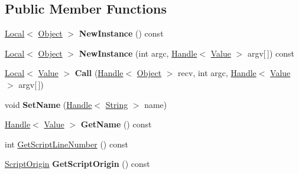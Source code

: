 \subsection*{Public Member Functions}
\begin{DoxyCompactItemize}
\item 
\hypertarget{classv8_1_1_function_a2bbac81200b840cbd484679aaa5b03d4}{}\hyperlink{classv8_1_1_local}{Local}$<$ \hyperlink{classv8_1_1_object}{Object} $>$ {\bfseries New\+Instance} () const \label{classv8_1_1_function_a2bbac81200b840cbd484679aaa5b03d4}

\item 
\hypertarget{classv8_1_1_function_a1261371c01bf18be5564f290af22e9d9}{}\hyperlink{classv8_1_1_local}{Local}$<$ \hyperlink{classv8_1_1_object}{Object} $>$ {\bfseries New\+Instance} (int argc, \hyperlink{classv8_1_1_handle}{Handle}$<$ \hyperlink{classv8_1_1_value}{Value} $>$ argv\mbox{[}$\,$\mbox{]}) const \label{classv8_1_1_function_a1261371c01bf18be5564f290af22e9d9}

\item 
\hypertarget{classv8_1_1_function_a168c16f181c5d5ff9ebe7db952c12b04}{}\hyperlink{classv8_1_1_local}{Local}$<$ \hyperlink{classv8_1_1_value}{Value} $>$ {\bfseries Call} (\hyperlink{classv8_1_1_handle}{Handle}$<$ \hyperlink{classv8_1_1_object}{Object} $>$ recv, int argc, \hyperlink{classv8_1_1_handle}{Handle}$<$ \hyperlink{classv8_1_1_value}{Value} $>$ argv\mbox{[}$\,$\mbox{]})\label{classv8_1_1_function_a168c16f181c5d5ff9ebe7db952c12b04}

\item 
\hypertarget{classv8_1_1_function_a5e244ce13d6f30ffa69f520126ada795}{}void {\bfseries Set\+Name} (\hyperlink{classv8_1_1_handle}{Handle}$<$ \hyperlink{classv8_1_1_string}{String} $>$ name)\label{classv8_1_1_function_a5e244ce13d6f30ffa69f520126ada795}

\item 
\hypertarget{classv8_1_1_function_adbbf95a036859381c06af3d05cd74b07}{}\hyperlink{classv8_1_1_handle}{Handle}$<$ \hyperlink{classv8_1_1_value}{Value} $>$ {\bfseries Get\+Name} () const \label{classv8_1_1_function_adbbf95a036859381c06af3d05cd74b07}

\item 
int \hyperlink{classv8_1_1_function_ae64de1b9dc1ea5dc4f419a88808c12c5}{Get\+Script\+Line\+Number} () const 
\item 
\hypertarget{classv8_1_1_function_af9c77c9bcbf698727071c7153e7c2513}{}\hyperlink{classv8_1_1_script_origin}{Script\+Origin} {\bfseries Get\+Script\+Origin} () const \label{classv8_1_1_function_af9c77c9bcbf698727071c7153e7c2513}

\end{DoxyCompactItemize}
